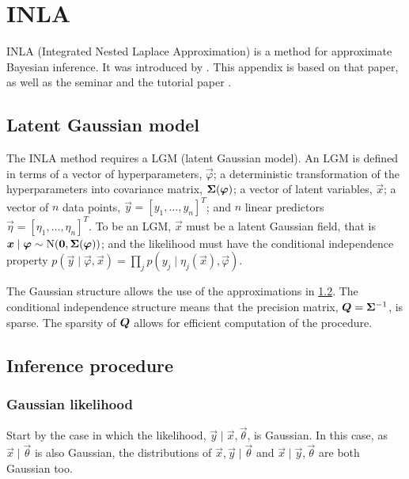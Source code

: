 \documentclass[thesis.tex]{subfiles}
\begin{document}
\chapter{INLA} \label{transmission:sec:INLA}


INLA (Integrated Nested Laplace Approximation) is a method for approximate Bayesian inference.
It was introduced by \textcite{rueINLA}.
This appendix is based on that paper, as well as the seminar \textcite{rueINLAseminar} and the tutorial paper \textcite{martinoINLAtutorial}.

\section{Latent Gaussian model}

The INLA method requires a LGM (latent Gaussian model).
An LGM is defined in terms of a vector of hyperparameters, $\vec{\varphi}$; a deterministic transformation of the hyperparameters into covariance matrix, $\bm{\Sigma}(\bm{\varphi})$; a vector of latent variables, $\vec{x}$; a vector of $n$ data points, $\vec{y} = [y_1, \dots, y_n]^T$; and $n$ linear predictors $\vec{\eta} = [\eta_1, \dots, \eta_n]^T$.
To be an LGM, $\vec{x}$ must be a latent Gaussian field, that is $\bm{x} \mid \bm{\varphi} \sim \operatorname{N}(\bm{0}, \bm{\Sigma}(\bm{\varphi}))$; and the likelihood must have the conditional independence property $p(\vec{y} \mid \vec{\varphi}, \vec{x}) = \prod_j p(y_j \mid \eta_j(\vec{x}), \vec{\varphi})$.

The Gaussian structure allows the use of the approximations in \cref{transmission:sec:INLA:inference}.
The conditional independence structure means that the precision matrix, $\bm{Q} = \bm{\Sigma}^{-1}$, is sparse.
The sparsity of $\bm{Q}$ allows for efficient computation of the procedure.

\section{Inference procedure} \label{transmission:sec:INLA:inference}

\subsection{Gaussian likelihood}

Start by the case in which the likelihood, $\vec{y} \mid \vec{x}, \vec{\theta}$, is Gaussian.
In this case, as $\vec{x} \mid \vec{\theta}$ is also Gaussian, the distributions of $\vec{x}, \vec{y} \mid \vec{\theta}$ and $\vec{x} \mid \vec{y}, \vec{\theta}$ are both Gaussian too.
\end{document}
